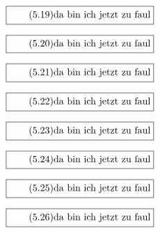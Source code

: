 \documentclass[11pt]{article}
\newcommand{\1}{ {\mathds{1}} }
\begin{document}
    \begin{equation}
      \boxed{
        \tag{5.19}
        \begin{split}
          \text{da bin ich jetzt zu faul}
        \end{split}
      }
    \end{equation}

    \begin{equation}
      \boxed{
        \tag{5.20}
        \begin{split}
          \text{da bin ich jetzt zu faul}
        \end{split}
      }
    \end{equation}

    \begin{equation}
      \boxed{
        \tag{5.21}
        \begin{split}
          \text{da bin ich jetzt zu faul}
        \end{split}
      }
    \end{equation}

    \begin{equation}
      \boxed{
        \tag{5.22}
        \begin{split}
          \text{da bin ich jetzt zu faul}
        \end{split}
      }
    \end{equation}

    \begin{equation}
      \boxed{
        \tag{5.23}
        \begin{split}
          \text{da bin ich jetzt zu faul}
        \end{split}
      }
    \end{equation}

    \begin{equation}
      \boxed{
        \tag{5.24}
        \begin{split}
          \text{da bin ich jetzt zu faul}
        \end{split}
      }
    \end{equation}

    \begin{equation}
      \boxed{
        \tag{5.25}
        \begin{split}
          \text{da bin ich jetzt zu faul}
        \end{split}
      }
    \end{equation}

    \begin{equation}
      \boxed{
        \tag{5.26}
        \begin{split}
          \text{da bin ich jetzt zu faul}
        \end{split}
      }
    \end{equation}
\end{document}
